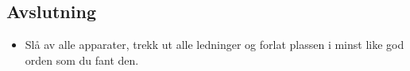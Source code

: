 \documentclass[../Elmag-labhefte-2020.tex]{subfiles}
\begin{document}
\subsection{Avslutning}

\begin{itemize}
    \item Slå av alle apparater, trekk ut alle ledninger og forlat plassen i minst like god orden som du fant den.
\end{itemize}

\end{document}
